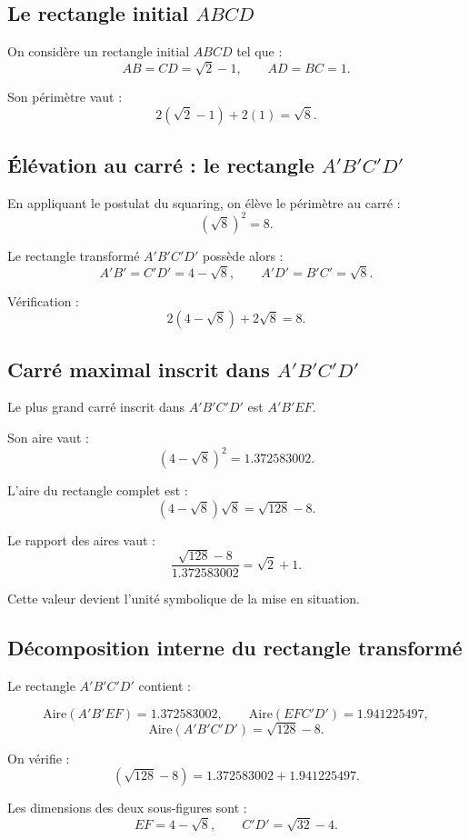 \documentclass[12pt,a4paper]{article}
\begin{document}
\subsection{Le rectangle initial $ABCD$}

On considère un rectangle initial $ABCD$ tel que :
\[
AB = CD = \sqrt{2} - 1,
\qquad
AD = BC = 1.
\]

Son périmètre vaut :
\[
2(\sqrt{2}-1) + 2(1) = \sqrt{8}.
\]

\subsection{Élévation au carré : le rectangle $A'B'C'D'$}

En appliquant le postulat du squaring, on élève le périmètre au carré :
\[
(\sqrt{8})^2 = 8.
\]

Le rectangle transformé $A'B'C'D'$ possède alors :
\[
A'B' = C'D' = 4 - \sqrt{8},
\qquad
A'D' = B'C' = \sqrt{8}.
\]

Vérification :
\[
2(4-\sqrt{8}) + 2\sqrt{8} = 8.
\]

\subsection{Carré maximal inscrit dans $A'B'C'D'$}

Le plus grand carré inscrit dans $A'B'C'D'$ est $A'B'EF$.

Son aire vaut :
\[
(4-\sqrt{8})^2 = 1.372583002.
\]

L’aire du rectangle complet est :
\[
(4-\sqrt{8})\sqrt{8} = \sqrt{128} - 8.
\]

Le rapport des aires vaut :
\[
\frac{\sqrt{128}-8}{1.372583002} = \sqrt{2} + 1.
\]

Cette valeur devient l’unité symbolique de la mise en situation.

\subsection{Décomposition interne du rectangle transformé}

Le rectangle $A'B'C'D'$ contient :

\[
\text{Aire}(A'B'EF) = 1.372583002,
\qquad
\text{Aire}(EFC'D') = 1.941225497,
\]
\[
\text{Aire}(A'B'C'D') = \sqrt{128} - 8.
\]

On vérifie :
\[
(\sqrt{128}-8) = 1.372583002 + 1.941225497.
\]

Les dimensions des deux sous-figures sont :
\[
EF = 4 - \sqrt{8},
\qquad
C'D' = \sqrt{32} - 4.
\]
\end{document}
